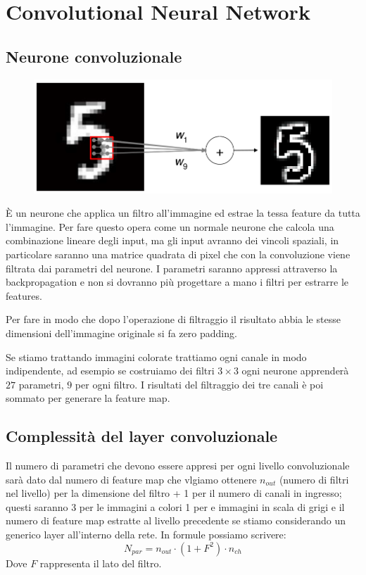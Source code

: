 \chapter{Convolutional Neural Network}

\section{Neurone convoluzionale}
\begin{figure}
	\vspace{-.2cm}
	\centering
	\includegraphics[width=.9\linewidth]{Picture/Convolutional_Neuron}
\end{figure}
È un neurone che applica un filtro all'immagine ed estrae la tessa feature da tutta l'immagine. Per fare questo opera come un normale neurone che calcola una combinazione lineare degli input, ma gli input avranno dei vincoli spaziali, in particolare saranno una matrice quadrata di pixel che con la convoluzione viene filtrata dai parametri del neurone. I parametri saranno appressi attraverso la backpropagation e non si dovranno più progettare a mano i filtri per estrarre le features.

Per fare in modo che dopo l'operazione di filtraggio il risultato abbia le stesse dimensioni dell'immagine originale si fa zero padding. 

Se stiamo trattando immagini colorate trattiamo ogni canale in modo indipendente, ad esempio se costruiamo dei filtri $3\times3$ ogni neurone apprenderà $27$ parametri, $9$ per ogni filtro. I risultati del filtraggio dei tre canali è poi sommato per generare la feature map.

\section{Complessità del layer convoluzionale}
Il numero di parametri che devono essere appresi per ogni livello convoluzionale sarà dato dal numero di feature map che vlgiamo ottenere $n_{out}$ (numero di filtri nel livello) per la dimensione del filtro + 1 per il numero di canali in ingresso; questi saranno 3 per le immagini a colori 1 per e immagini in scala di grigi e  il numero di feature map estratte al livello precedente se stiamo considerando un generico layer all'interno della rete.  In formule possiamo scrivere:
\begin{equation}
	N_{par} = n_{out} \cdot (1+F^2)\cdot n_{ch}
\end{equation}
Dove $F$ rappresenta il lato del filtro.
